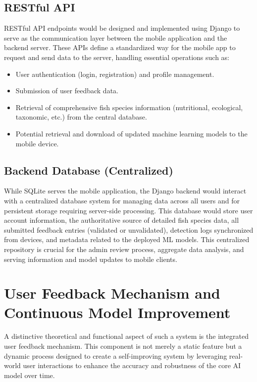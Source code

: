 \subsection{RESTful API}
RESTful API endpoints would be designed and implemented using Django to serve as the communication
layer between the mobile application and the backend server. These APIs define a standardized way for the
mobile app to request and send data to the server, handling essential operations such as:

\begin{itemize}
\item{User authentication (login, registration) and profile management.}
\item{Submission of user feedback data.}
\item{Retrieval of comprehensive fish species information (nutritional, ecological, taxonomic, etc.) from the
central database.}
\item{Potential retrieval and download of updated machine learning models to the mobile device.}
\end{itemize}

\subsection{Backend Database (Centralized)}
While SQLite serves the mobile application, the Django backend would interact with a centralized database
system for managing data across all users and for persistent storage requiring server-side processing. This
database would store user account information, the authoritative source of detailed fish species data, all
submitted feedback entries (validated or unvalidated), detection logs synchronized from devices, and metadata related to the deployed ML models. This centralized repository is crucial for the admin review process,
aggregate data analysis, and serving information and model updates to mobile clients.

\newpage
\section{User Feedback Mechanism and Continuous Model Improvement}
A distinctive theoretical and functional aspect of such a system is the integrated user feedback mechanism.
This component is not merely a static feature but a dynamic process designed to create a self-improving
system by leveraging real-world user interactions to enhance the accuracy and robustness of the core AI
model over time.


